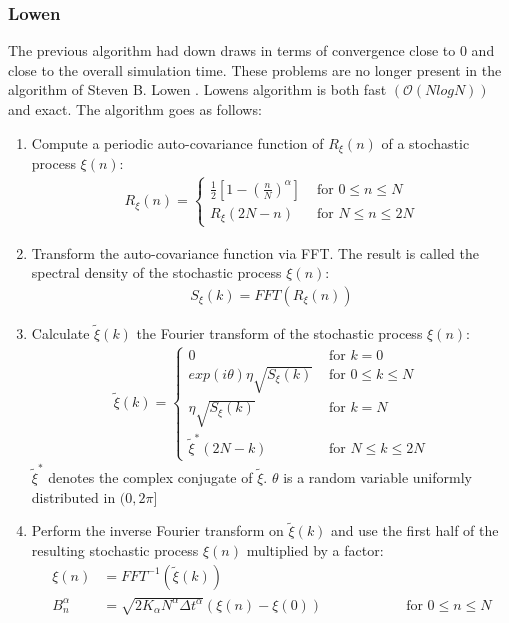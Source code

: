 \documentclass[
  a4paper,BCOR10mm,oneside,
  bibtotoc,idxtotoc,
  headsepline,footsepline,%
  fleqn,openbib
]{scrbook}
\begin{document}
\subsubsection{Lowen}
The previous algorithm had down draws in terms of convergence close to 0 and close to the overall simulation time. These problems are no longer present in the algorithm of Steven B. Lowen \cite{Lowen1999}. Lowens algorithm is both fast $(\mathcal{O}(NlogN))$ and exact. The algorithm goes as follows:
\begin{enumerate}
 \item Compute a periodic auto-covariance function of $R_{\xi}(n)$ of a stochastic process $\xi(n)$:
 \begin{align}
  R_{\xi}(n)=
  \begin{cases}
   \frac{1}{2}\left[1-\left(\frac{n}{N}\right)^{\alpha} \right]  & \text{ for    } 0 \leq n \leq N \\
   R_{\xi}(2N-n)  & \text{ for    } N \leq n \leq 2N 
  \end{cases}
 \end{align}
 \item Transform the auto-covariance function via FFT. The result is called the spectral density of the stochastic process $\xi(n)$:
  \begin{align}
   S_{\xi}(k)= FFT(R_{\xi}(n))
  \end{align}
 \item Calculate $\tilde\xi(k)$ the Fourier transform of the stochastic process $\xi(n)$:
 \begin{align}
  \tilde\xi(k)=
  \begin{cases}
     0  & \text{ for    } k=0 \\    
     exp(i \theta) \eta \sqrt{S_{\xi}(k)}  & \text{ for    } 0 \leq k \leq N \\
     \eta \sqrt{S_{\xi}(k)}  & \text{ for    } k = N \\
     \tilde\xi^{*}(2N-k) & \text{ for    } N \leq k \leq 2N 
  \end{cases}
 \end{align}
 $\tilde\xi^{*}$ denotes the complex conjugate of $\tilde\xi$. $\theta$ is a random variable uniformly distributed  in $(0,2\pi]$  
 \item Perform the inverse Fourier transform on $\tilde\xi(k)$ and use the first half of the resulting stochastic process $\xi(n)$ multiplied by a factor:
 \begin{align}
  \xi(n)&=FFT^{-1}(\tilde\xi(k)) \\
  B^{\alpha}_n&=  \sqrt{2 K_{\alpha} N^{\alpha} \Delta t^{\alpha}} (\xi(n)- \xi(0)) \qquad \qquad \qquad \text{for    } 0 \leq n \leq N
 \end{align}
\end{enumerate}
\end{document}
